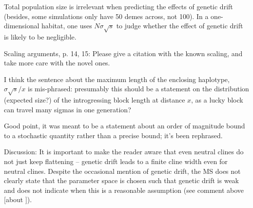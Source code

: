 \begin{point}{\revref}
Total population size is irrelevant when predicting the effects of genetic drift (besides, some simulations only have 50 demes across, not 100). In a one-dimensional habitat, one uses $N \sigma \sqrt{s}$ to judge whether the effect of genetic drift is likely to be negligible.
\end{point}

\reply
{}

\begin{point}{Scaling arguments, p. 14, 15:}
 Please give a citation with the known scaling, and take more care with the novel ones.  
\end{point}

\reply
{}

\begin{point}{\revref}
 I think the sentence about the maximum length of the enclosing haplotype, $\sigma \sqrt{s} / x$ is mis-phrased: presumably this should be a statement on the distribution (expected size?) of the introgressing block length at distance $x$, as a lucky block can travel many sigmas in one generation?
\end{point}

\reply
Good point, it was meant to be a statement about an order of magnitude bound to a stochastic quantity rather than a precise bound; it's been rephrased.

\begin{point}{Discussion:}
    It is important to make the reader aware that even neutral clines do not just keep flattening -- genetic drift leads to a finite cline width even for neutral clines. Despite the occasional mention of genetic drift, the MS does not clearly state that the parameter space is chosen such that genetic drift is weak and does not indicate when this is a reasonable assumption (see comment above [about ]).
\end{point}

\reply
{}


